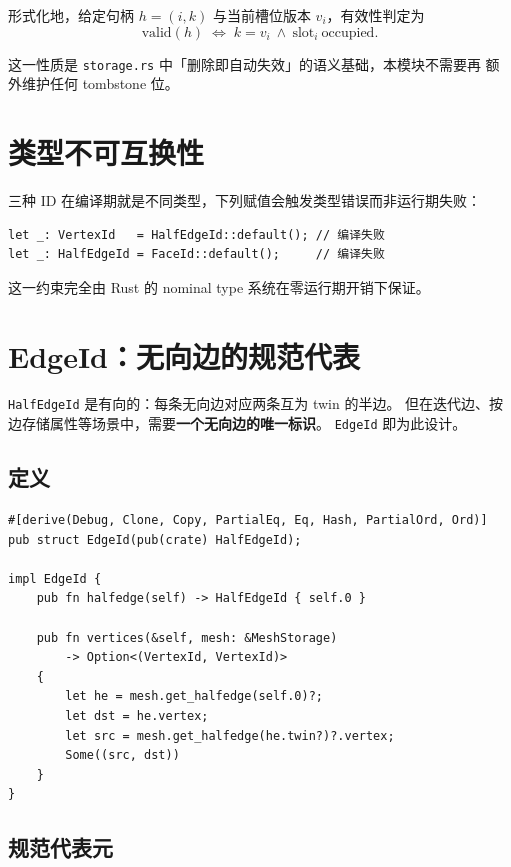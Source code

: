 \documentclass[11pt,a4paper]{article}
\begin{document}
形式化地，给定句柄 $h=(i,k)$ 与当前槽位版本 $v_i$，有效性判定为
\[
\text{valid}(h) \;\Longleftrightarrow\; k = v_i \ \wedge\ \text{slot}_i\ \text{occupied}.
\]

这一性质是 \texttt{storage.rs} 中「删除即自动失效」的语义基础，本模块不需要再
额外维护任何 tombstone 位。

\section{类型不可互换性}

三种 ID 在编译期就是不同类型，下列赋值会触发类型错误而非运行期失败：

\begin{lstlisting}
let _: VertexId   = HalfEdgeId::default(); // 编译失败
let _: HalfEdgeId = FaceId::default();     // 编译失败
\end{lstlisting}

这一约束完全由 Rust 的 nominal type 系统在零运行期开销下保证。

\section{EdgeId：无向边的规范代表}

\texttt{HalfEdgeId} 是有向的：每条无向边对应两条互为 twin 的半边。
但在迭代边、按边存储属性等场景中，需要\textbf{一个无向边的唯一标识}。
\texttt{EdgeId} 即为此设计。

\subsection{定义}

\begin{lstlisting}
#[derive(Debug, Clone, Copy, PartialEq, Eq, Hash, PartialOrd, Ord)]
pub struct EdgeId(pub(crate) HalfEdgeId);

impl EdgeId {
    pub fn halfedge(self) -> HalfEdgeId { self.0 }

    pub fn vertices(&self, mesh: &MeshStorage)
        -> Option<(VertexId, VertexId)>
    {
        let he = mesh.get_halfedge(self.0)?;
        let dst = he.vertex;
        let src = mesh.get_halfedge(he.twin?)?.vertex;
        Some((src, dst))
    }
}
\end{lstlisting}

\subsection{规范代表元}
\end{document}
